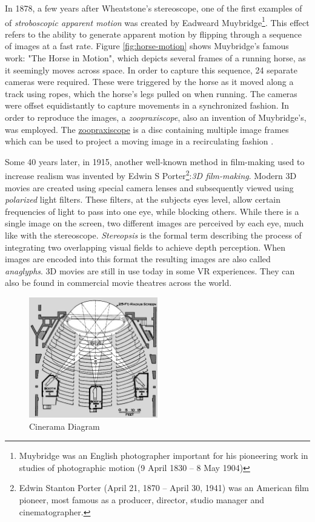 In 1878, a few years after Wheatstone's stereoscope, one of the first examples of of \textit{stroboscopic apparent motion} was created by Eadweard Muybridge\footnote{Muybridge was an English photographer important for his pioneering work in studies of photographic motion (9 April 1830 – 8 May 1904)}. This effect refers to the ability to generate apparent motion by flipping through a sequence of images at a fast rate. Figure \ref{fig:horse-motion} shows Muybridge's famous work: "The Horse in Motion", which depicts several frames of a running horse, as it seemingly moves across space. In order to capture this sequence, 24 separate cameras were required. These were triggered by the horse as it moved along a track using ropes, which the horse's legs pulled on when running. The cameras were offset equidistantly to capture movements in a synchronized fashion. In order to reproduce the images, a \textit{zoopraxiscope}, also an invention of Muybridge's, was employed. The \href{https://upload.wikimedia.org/wikipedia/commons/0/06/The_zoopraxiscope-Horse_galloping-Animated.gif}{zoopraxiscope} is a disc containing multiple image frames which can be used to project a moving image in a recirculating fashion \cite{lavalle2016virtual}. 

Some 40 years later, in 1915, another well-known method in film-making used to increase realism was invented by Edwin S Porter\footnote{Edwin Stanton Porter (April 21, 1870 – April 30, 1941) was an American film pioneer, most famous as a producer, director, studio manager and cinematographer.}:\textit{3D film-making}. Modern 3D movies are created using special camera lenses and subsequently viewed using \textit{polarized} light filters. These filters, at the subjects eyes level, allow certain frequencies of light to pass into one eye, while blocking others. While there is a single image on the screen, two different images are perceived by each eye, much like with the stereoscope. \textit{Stereopsis} is the formal term describing the process of integrating two overlapping visual fields to achieve depth perception. When images are encoded into this format the resulting images are also called \textit{anaglyphs}. 3D movies are still in use today in some VR experiences. They can also be found in commercial movie theatres across the world. 

\begin{figure}[ht!]%
\centering
\includegraphics[width=0.5\textwidth]{img/cinerama.jpg} 
\caption{Cinerama Diagram \cite{FileHowC90online}}
\label{img:cinerama}
\end{figure}

